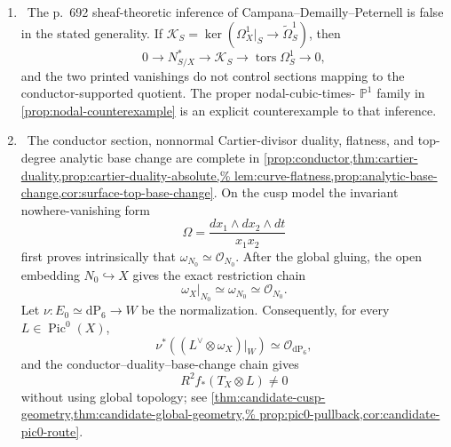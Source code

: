 \begin{enumerate}[leftmargin=1.8em]
\item \Refuted\ The p.~692 sheaf-theoretic inference of
Campana--Demailly--Peternell is false in the stated generality.  If
\(
\mathscr K_S=\ker(\Omega_X^1|_S\to\widetilde\Omega_S^1)
\), then
\[
0\longrightarrow N^*_{S/X}\longrightarrow\mathscr K_S
\longrightarrow\operatorname{tors}\Omega_S^1\longrightarrow0,
\]
and the two printed vanishings do not control sections mapping to the
conductor-supported quotient.  The proper nodal-cubic-times-
\(\mathbb P^1\) family in \cref{prop:nodal-counterexample} is an explicit
counterexample to that inference.

\item \Verified\ The conductor section, nonnormal Cartier-divisor duality,
flatness, and top-degree analytic base change are complete in
\cref{prop:conductor,thm:cartier-duality,prop:cartier-duality-absolute,%
lem:curve-flatness,prop:analytic-base-change,cor:surface-top-base-change}.
On the cusp model the invariant nowhere-vanishing form
\[
 \Omega=\frac{dx_1\wedge dx_2\wedge dt}{x_1x_2}
\]
first proves intrinsically that
\(\omega_{N_0}\simeq\mathcal O_{N_0}\).  After the global gluing, the open
embedding \(N_0\hookrightarrow X\) gives the exact restriction chain
\[
 \omega_X|_{N_0}\simeq\omega_{N_0}\simeq\mathcal O_{N_0}.
\]
Let \(\nu:E_0\simeq\mathrm{dP}_6\to W\) be the normalization.
Consequently, for every \(L\in\operatorname{Pic}^0(X)\),
\[
 \nu^*((L^\vee\otimes\omega_X)|_W)
 \simeq\mathcal O_{\mathrm{dP}_6},
\]
and the conductor--duality--base-change chain gives
\[
 R^2f_*(T_X\otimes L)\ne0
\]
without using global topology; see
\cref{thm:candidate-cusp-geometry,thm:candidate-global-geometry,%
prop:pic0-pullback,cor:candidate-pic0-route}.


\end{enumerate}
